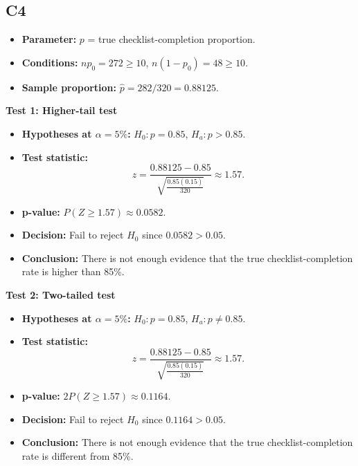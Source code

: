 \subsection*{C4}
\begin{itemize}
	\item \textbf{Parameter:} \(p\) = true checklist-completion proportion.
	\item \textbf{Conditions:} \(np_0=272\ge10\), \(n(1-p_0)=48\ge10\).
	\item \textbf{Sample proportion:} \(\hat p=282/320=0.88125\).
\end{itemize}

\textbf{Test 1: Higher-tail test}

\begin{itemize}
	\item \textbf{Hypotheses at \(\alpha=5\%\):} \(H_0\colon p=0.85\), \(H_a\colon p>0.85\).
	\item \textbf{Test statistic:}
	\[
	z=\frac{0.88125-0.85}{\sqrt{\frac{0.85(0.15)}{320}}}\approx 1.57.
	\]
	\item \textbf{p-value:} \(P(Z\ge 1.57)\approx 0.0582\).
	\item \textbf{Decision:} Fail to reject \(H_0\) since \(0.0582>0.05\).
	\item \textbf{Conclusion:} There is not enough evidence that the true checklist-completion rate is higher than 85\%.
\end{itemize}

\begin{center}
\end{center}


\textbf{Test 2: Two-tailed test}

\begin{itemize}
	\item \textbf{Hypotheses at \(\alpha=5\%\):} \(H_0\colon p=0.85\), \(H_a\colon p\ne0.85\).
	\item \textbf{Test statistic:}
	\[
	z=\frac{0.88125-0.85}{\sqrt{\frac{0.85(0.15)}{320}}}\approx 1.57.
	\]
	\item \textbf{p-value:} \(2P(Z\ge 1.57)\approx 0.1164\).
	\item \textbf{Decision:} Fail to reject \(H_0\) since \(0.1164>0.05\).
	\item \textbf{Conclusion:} There is not enough evidence that the true checklist-completion rate is different from 85\%.
\end{itemize}

